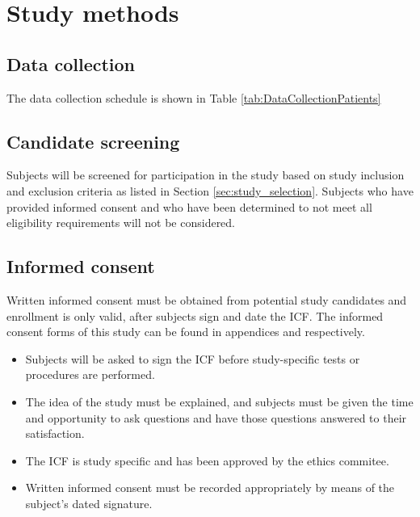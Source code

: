 \section{Study methods}
\subsection{Data collection}
The data collection schedule is shown in Table \ref{tab:DataCollectionPatients}

\subsection{Candidate screening}
\label{subsec:screening}
Subjects will be screened for participation in the study based on study inclusion and exclusion criteria as listed in Section \ref{sec:study_selection}. Subjects who have provided informed consent and who have been determined to not meet all eligibility requirements will not be considered.

\subsection{Informed consent}
Written informed consent must be obtained from potential study candidates and enrollment is only valid, after subjects sign and date the \ac{ICF}. The informed consent forms of this study can be found in appendices \label{sec:icf_patient} and \label{sec:icf_relative} respectively.

\begin{itemize}[noitemsep, topsep=0pt]
\item Subjects will be asked to sign the \ac{ICF} before study-specific tests or procedures are performed.
\item The idea of the study must be explained, and subjects must be given the time and opportunity to ask questions and have those questions answered to their satisfaction.
\item The \ac{ICF} is study specific and has been approved by the ethics commitee.
\item Written informed consent must be recorded appropriately by means of the subject’s dated signature.
\end{itemize}

